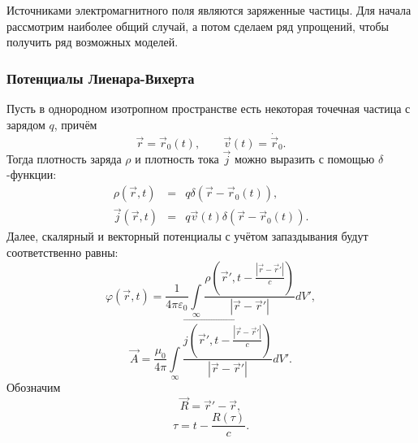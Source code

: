 Источниками электромагнитного поля являются заряженные частицы. Для начала рассмотрим наиболее общий случай, а потом сделаем ряд упрощений, чтобы получить ряд возможных моделей.

\subsubsection{Потенциалы Лиенара-Вихерта}

Пусть в однородном изотропном пространстве есть некоторая точечная частица с зарядом $q$, причём
\begin{equation}
\vec{r} = \vec{r}_0(t), \qquad \vec{v}(t) = \dot{\vec{r}}_0.
\end{equation}
Тогда плотность заряда $\rho$ и плотность тока $\vec{j}$ можно выразить с помощью $\delta$-функции:
\begin{eqnarray}
\rho(\vec{r},t) &=& q \delta(\vec{r} - \vec{r}_0(t)), \\
\vec{j}(\vec{r},t) &=& q \vec{v}(t) \delta(\vec{r} - \vec{r}_0(t)).
\end{eqnarray}
Далее, скалярный и векторный потенциалы с учётом запаздывания будут соответственно равны:
\begin{equation}
\varphi(\vec{r},t) = \frac{1}{4 \pi \varepsilon_0} \int \limits_{\infty} \frac{\rho(\vec{r}',t - \frac{|\vec{r} - \vec{r}'|}{c})}{|\vec{r} - \vec{r}'|} dV',
\label{eq:phi_poy0}
\end{equation}
\begin{equation}
\vec{A} = \frac{\mu_0}{4 \pi} \int \limits_{\infty} \frac{\vec{j (\vec{r}',t - \frac{|\vec{r} - \vec{r}'|}{c}) }}{|\vec{r} - \vec{r}'|} dV'.
\label{eq:A_pot0}
\end{equation}
Обозначим 
\begin{equation}
\vec{R} = \vec{r}' - \vec{r},
\end{equation}
\begin{equation}
\tau = t - \frac{R(\tau)}{c}.
\label{eq:wait_for_me2}
\end{equation}

